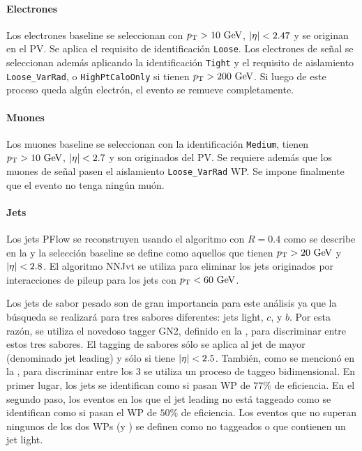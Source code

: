 \paragraph{Electrones}

Los electrones baseline se seleccionan con \(p_{\text{T}} > 10~\text{GeV}\), \(|\eta| < 2.47\) y se originan en el \ac{PV}. Se aplica el requisito de identificación \texttt{Loose}. Los electrones de señal se seleccionan además aplicando la identificación \texttt{Tight} y el requisito de aislamiento \texttt{Loose\_VarRad}, o \texttt{HighPtCaloOnly} si tienen \(p_{\text{T}} > 200~\text{GeV}\). Si luego de este proceso queda algún electrón, el evento se remueve completamente.


\paragraph{Muones}
Los muones baseline se seleccionan con la identificación \texttt{Medium}, tienen \(p_{\text{T}} > 10~\text{GeV}\), \(|\eta| < 2.7\) y son originados del \ac{PV}. Se requiere además que los muones de señal pasen el aislamiento \texttt{Loose\_VarRad} \ac{WP}. Se impone finalmente que el evento no tenga ningún muón.


\paragraph{Jets}

Los jets \ac{PFlow} se reconstruyen usando el algoritmo \antikt con \(R=0.4\) como se describe en la \Sect{\ref{sec:objects:jets}} y la selección baseline se define como aquellos que tienen \(p_{\text{T}}>20~\text{GeV}\) y \(|\eta|<2.8\). El algoritmo \ac{NNJvt} se utiliza para eliminar los jets originados por interacciones de pileup para los jets con \(p_{\text{T}}<60~\text{GeV}\).

Los jets de sabor pesado son de gran importancia para este análisis ya que la búsqueda se realizará para tres sabores diferentes: jets light, \(c\), y \(b\). Por esta razón, se utiliza el novedoso tagger GN2, definido en la \Sect{\ref{sec:objects:ftag}}, para discriminar entre estos tres sabores.
El tagging de sabores sólo se aplica al jet de mayor \pt (denominado jet leading) y sólo si tiene \(|\eta| < 2.5\).
También, como se mencionó en la \Sect{\ref{sec:objects:ftag}}, para discriminar entre los 3 se utiliza un proceso de taggeo bidimensional. En primer lugar, los jets se identifican como \bjets si pasan \ac{WP} de \(77\%\) de eficiencia.
En el segundo paso, los eventos en los que el jet leading no está taggeado como \bjet se identifican como \cjet si pasan el \ac{WP} de \(50\%\) de eficiencia. Los eventos que no superan ningunos de los dos \acp{WP} (\btag y \ctag) se definen como no taggeados o que contienen un jet light.



